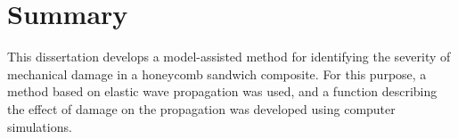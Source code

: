 
\chapter[Summary]{Summary}
\label{ch:summary}

This dissertation develops a model-assisted method for identifying the severity of mechanical damage in a honeycomb sandwich composite.
For this purpose, a method based on elastic wave propagation was used, and a function describing the effect of damage on the propagation was developed using computer simulations.
